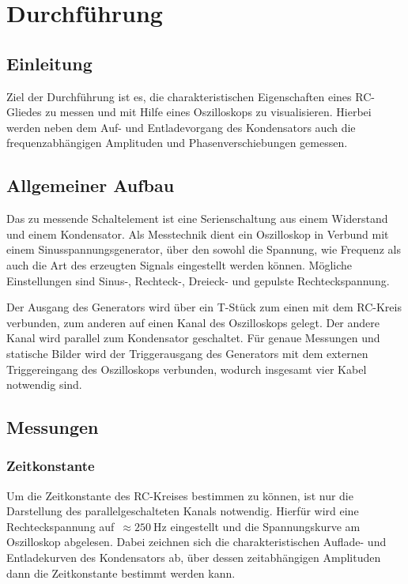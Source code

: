\section{Durchführung}
\label{sec:Durchführung}

\subsection{Einleitung}
Ziel der Durchführung ist es, die charakteristischen Eigenschaften eines RC-Gliedes zu messen und mit Hilfe eines Oszilloskops
zu visualisieren. Hierbei werden neben dem Auf- und Entladevorgang des Kondensators auch die frequenzabhängigen Amplituden und
Phasenverschiebungen gemessen.

\subsection{Allgemeiner Aufbau}
Das zu messende Schaltelement ist eine Serienschaltung aus einem Widerstand und einem Kondensator.
Als Messtechnik dient ein Oszilloskop in Verbund mit einem Sinusspannungsgenerator, über den sowohl die Spannung, wie Frequenz 
als auch die Art des erzeugten Signals eingestellt werden können. Mögliche Einstellungen sind Sinus-, Rechteck-, Dreieck- und gepulste Rechteckspannung.

Der Ausgang des Generators wird über ein T-Stück zum einen mit dem RC-Kreis verbunden, zum anderen auf einen Kanal des Oszilloskops gelegt.
Der andere Kanal wird parallel zum Kondensator geschaltet. Für genaue Messungen und statische Bilder wird der Triggerausgang des Generators 
mit dem externen Triggereingang des Oszilloskops verbunden, wodurch insgesamt vier Kabel notwendig sind.

\subsection{Messungen}
\subsubsection{Zeitkonstante}
Um die Zeitkonstante des RC-Kreises bestimmen zu können, ist nur die Darstellung des parallelgeschalteten Kanals notwendig.
Hierfür wird eine Rechteckspannung auf~$\approx \SI{250}{\hertz}$ eingestellt und die Spannungskurve am Oszilloskop abgelesen.
Dabei zeichnen sich die charakteristischen Auflade- und Entladekurven des Kondensators ab, über dessen zeitabhängigen Amplituden dann die Zeitkonstante bestimmt werden kann.

